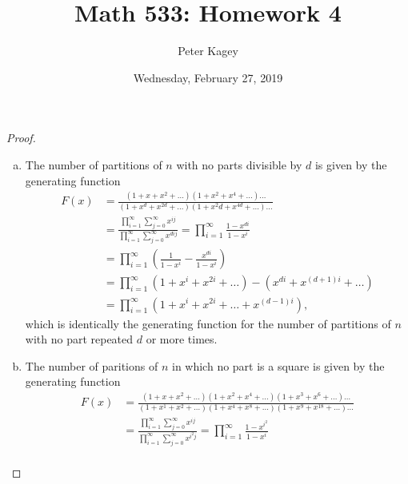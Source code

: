 \documentclass{article}
\newenvironment{problem}[2][Problem]{\begin{trivlist}
\item[\hskip \labelsep {\bfseries #1}\hskip \labelsep {\bfseries #2.}]}{\end{trivlist}}
\newcommand{\paren}[1]{\left( #1 \right)}
\begin{document}
\title{Math 533: Homework 4}
\author{Peter Kagey}
\date{Wednesday, February 27, 2019}

\maketitle

\begin{problem}{1}
\end{problem}

\begin{proof} ~
  \begin{enumerate}[(a)]
    \item The number of partitions of $n$ with no parts divisible by $d$ is
    given by the generating function \begin{align*}
      F(x)
      &= \frac{
        (1 + x + x^2 + \hdots)(1 + x^2 + x^4 + \hdots)\hdots
      }{
        (1 + x^d + x^{2d} + \hdots)(1 + x^2d + x^{4d} + \hdots)\hdots
      } \\
      &= \frac{
        \displaystyle\prod_{i=1}^\infty\sum_{j=0}^\infty x^{ij}
      }{
        \displaystyle\prod_{i=1}^\infty\sum_{j=0}^\infty x^{dij}
      }
      = \prod_{i=1}^\infty \frac{1-x^{di}}{1-x^i} \\
      &= \prod_{i=1}^\infty \paren{\frac{1}{1-x^i} - \frac{x^{di}}{1-x^i}} \\
      &= \prod_{i=1}^\infty (1 + x^i + x^{2i} + \hdots) - (x^{di} + x^{(d+1)i} + \hdots) \\
      &= \prod_{i=1}^\infty (1 + x^i + x^{2i} + \hdots + x^{(d-1)i}),
    \end{align*}
    which is identically the generating function for the number of partitions of
    $n$ with no part repeated $d$ or more times.
    \item The number of paritions of $n$ in which no part is a square is given
    by the generating function
    \begin{align*}
      F(x)
      &= \frac{
        (1 + x + x^2 + \hdots)(1 + x^2 + x^4 + \hdots)(1 + x^3 + x^6 + \hdots)\hdots
      }{
        (1 + x^1 + x^2 + \hdots)(1 + x^{4} + x^{8} + \hdots)(1 + x^9 + x^{18} + \hdots)\hdots
      } \\
      &= \frac{
        \displaystyle\prod_{i=1}^\infty\sum_{j=0}^\infty x^{ij}
      }{
        \displaystyle\prod_{i=1}^\infty\sum_{j=0}^\infty x^{i^2j}
      }
      = \prod_{i=1}^\infty \frac{1-x^{i^2}}{1-x^i} \\

\end{align*}
\end{enumerate}
\end{proof}
\end{document}
